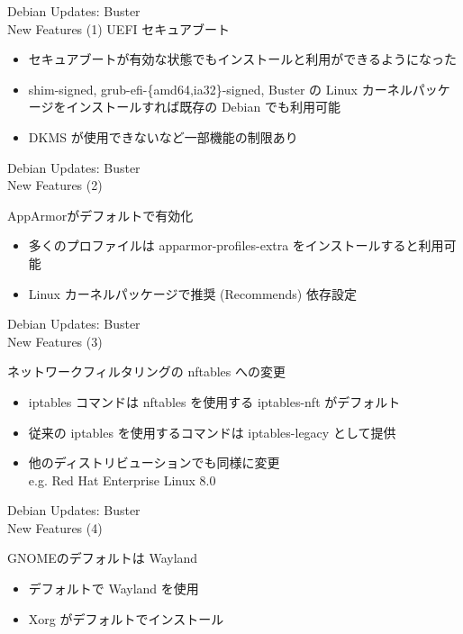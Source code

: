 \documentclass[cjk,c,squeeze,shrink,dvipdfmx,12pt]{beamer}
\begin{document}
\begin{frame}[fragile]{%
    Debian Updates: Buster%
    \\[-.5em]{\normalsize{New Features (1)}}
  }
  UEFI セキュアブート

  \begin{itemize}
  \item セキュアブートが有効な状態でもインストールと利用ができるようになった
  \item shim-signed, grub-efi-\{amd64,ia32\}-signed, Buster の Linux カーネルパッケージをインストールすれば既存の Debian でも利用可能
  \item DKMS が使用できないなど一部機能の制限あり
  \end{itemize}
\end{frame}

\begin{frame}[fragile]{%
    Debian Updates: Buster%
    \\[-.5em]{\normalsize{New Features (2)}}
  }

  AppArmorがデフォルトで有効化

  \begin{itemize}
  \item 多くのプロファイルは apparmor-profiles-extra をインストールすると利用可能
  \item Linux カーネルパッケージで推奨 (Recommends) 依存設定
  \end{itemize}
\end{frame}

\begin{frame}[fragile]{%
    Debian Updates: Buster%
    \\[-.5em]{\normalsize{New Features (3)}}
  }

  ネットワークフィルタリングの nftables への変更

  \begin{itemize}
  \item iptables コマンドは nftables を使用する iptables-nft がデフォルト
  \item 従来の iptables を使用するコマンドは iptables-legacy として提供
  \item 他のディストリビューションでも同様に変更\\
    e.g. Red Hat Enterprise Linux 8.0
  \end{itemize}
\end{frame}

\begin{frame}[fragile]{%
    Debian Updates: Buster%
    \\[-.5em]{\normalsize{New Features (4)}}
  }

  GNOMEのデフォルトは Wayland

  \begin{itemize}
  \item デフォルトで Wayland を使用
  \item Xorg がデフォルトでインストール
  \end{itemize}
\end{frame}
\end{document}
